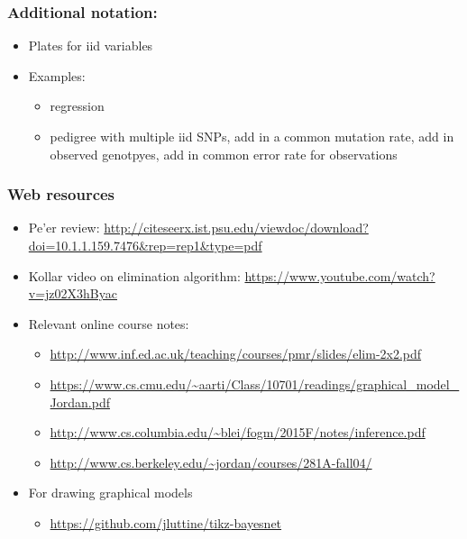 \documentclass[10pt,containsverbatim,paralist]{article}
\begin{document}
\subsubsection*{Additional notation:}
\label{sec-1-1-6}
\begin{itemize}
\item Plates for iid variables
\label{sec-1-1-6-1}
\item Examples:
\label{sec-1-1-6-2}
\begin{itemize}
\item regression
\item pedigree with multiple iid SNPs, add in a common mutation rate, add in observed genotpyes, add in common error rate for observations
\end{itemize}
\end{itemize}
\subsubsection*{Web resources}
\label{sec-1-1-7}
\begin{itemize}
\item Pe'er review: \url{http://citeseerx.ist.psu.edu/viewdoc/download?doi=10.1.1.159.7476&rep=rep1&type=pdf}
\label{sec-1-1-7-1}
\item Kollar video on elimination algorithm: \url{https://www.youtube.com/watch?v=jz02X3hByac}
\label{sec-1-1-7-2}
\item Relevant online course notes:
\label{sec-1-1-7-3}
\begin{itemize}
\item \url{http://www.inf.ed.ac.uk/teaching/courses/pmr/slides/elim-2x2.pdf}
\item \url{https://www.cs.cmu.edu/~aarti/Class/10701/readings/graphical_model_Jordan.pdf}
\item \url{http://www.cs.columbia.edu/~blei/fogm/2015F/notes/inference.pdf}
\item \url{http://www.cs.berkeley.edu/~jordan/courses/281A-fall04/}
\end{itemize}
\item For drawing graphical models
\label{sec-1-1-7-4}
\begin{itemize}
\item \url{https://github.com/jluttine/tikz-bayesnet}
\end{itemize}
\end{itemize}
\end{document}
